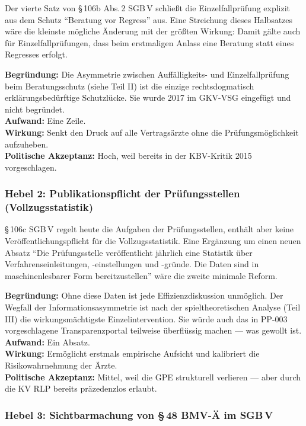 \documentclass{umbruch-position}
\begin{document}
Der vierte Satz von \S\,106b Abs.\,2 SGB\,V schließt die Einzelfallprüfung explizit aus dem Schutz ``Beratung vor Regress'' aus. Eine Streichung dieses Halbsatzes wäre die kleinste mögliche Änderung mit der größten Wirkung: Damit gälte auch für Einzelfallprüfungen, dass beim erstmaligen Anlass eine Beratung statt eines Regresses erfolgt.

\textbf{Begründung:} Die Asymmetrie zwischen Auffälligkeits- und Einzelfallprüfung beim Beratungsschutz (siehe Teil II) ist die einzige rechtsdogmatisch erklärungsbedürftige Schutzlücke. Sie wurde 2017 im GKV-VSG eingefügt und nicht begründet.\\
\textbf{Aufwand:} Eine Zeile.\\
\textbf{Wirkung:} Senkt den Druck auf alle Vertragsärzte ohne die Prüfungsmöglichkeit aufzuheben.\\
\textbf{Politische Akzeptanz:} Hoch, weil bereits in der KBV-Kritik 2015 vorgeschlagen.

\subsubsection*{Hebel 2: Publikationspflicht der Prüfungsstellen (Vollzugsstatistik)}

\S\,106c SGB\,V regelt heute die Aufgaben der Prüfungsstellen, enthält aber keine Veröffentlichungspflicht für die Vollzugsstatistik. Eine Ergänzung um einen neuen Absatz ``Die Prüfungsstelle veröffentlicht jährlich eine Statistik über Verfahrenseinleitungen, -einstellungen und -gründe. Die Daten sind in maschinenlesbarer Form bereitzustellen'' wäre die zweite minimale Reform.

\textbf{Begründung:} Ohne diese Daten ist jede Effizienzdiskussion unmöglich. Der Wegfall der Informationsasymmetrie ist nach der spieltheoretischen Analyse (Teil III) die wirkungsmächtigste Einzelintervention. Sie würde auch das in PP-003 vorgeschlagene Transparenzportal teilweise überflüssig machen — was gewollt ist.\\
\textbf{Aufwand:} Ein Absatz.\\
\textbf{Wirkung:} Ermöglicht erstmals empirische Aufsicht und kalibriert die Risikowahrnehmung der Ärzte.\\
\textbf{Politische Akzeptanz:} Mittel, weil die GPE strukturell verlieren — aber durch die KV RLP bereits präzedenzlos erlaubt.

\subsubsection*{Hebel 3: Sichtbarmachung von \S\,48 BMV-Ä im SGB\,V}
\end{document}
